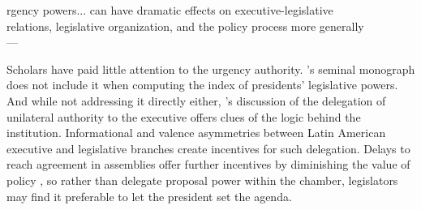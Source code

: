 \documentclass[letter,12pt]{article}
\begin{document}
\begin{center}
\singlespacing
[U]rgency powers... can have dramatic effects on executive-legislative \\ 
relations, legislative organization, and the policy process more generally\\ 
---\citet[][:438]{morgenstern.2002b}
\end{center}
\onehalfspacing


\noindent Scholars have paid little attention to the urgency authority. \citeauthor{shugart.carey.1992}'s \citeyearpar{shugart.carey.1992} seminal monograph does not include it when computing the index of presidents' legislative powers. And while not addressing it directly either, \citeauthor{carey.shugart.1998a}'s \citeyearpar{carey.shugart.1998a} discussion of the delegation of unilateral authority to the executive offers clues of the logic behind the institution. Informational and valence asymmetries between Latin American executive and legislative branches create incentives for such delegation. Delays to reach agreement in assemblies offer further incentives by diminishing the value of policy \citep{baron.ferejohn.1989}, so rather than delegate proposal power within the chamber, legislators may find it preferable to let the president set the agenda. 

\end{document}
